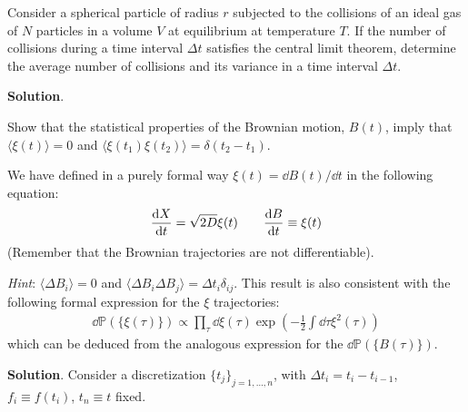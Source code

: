 \documentclass[../template.tex]{subfiles}
\begin{document}
\begin{exo}
    Consider a spherical particle of radius $r$ subjected to the collisions of an ideal gas of $N$ particles in a volume $V$ at equilibrium at temperature $T$. If the number of collisions during a time interval $\Delta t$ satisfies the central limit theorem, determine the average number of collisions and its variance in a time interval $\Delta t$.

    \medskip

    \textbf{Solution}. 
\end{exo}

\begin{exo}
    Show that the statistical properties of the Brownian motion, $B(t)$, imply that $\langle \xi(t) \rangle = 0$ and $\langle \xi(t_1) \xi(t_2) \rangle = \delta(t_2 - t_1)$.

    We have defined in a purely formal way $\xi(t) = \dd{B(t)}/\dd{t}$ in the following equation:
    \begin{align*}
        \dv{X}{t}(t) = \sqrt{2D} \xi(t) \qquad \dv{B}{t}(t) \equiv \xi(t)
    \end{align*}
    (Remember that the Brownian trajectories are not differentiable).
    \medskip

    \textit{Hint}: $\langle \Delta B_i \rangle = 0$ and $\langle \Delta B_i \Delta B_j \rangle = \Delta t_i \delta_{ij}$. This result is also consistent with the following formal expression for the $\xi$ trajectories:
    \begin{align*}
        \dd{\mathbb{P}}(\{\xi(\tau)\}) \propto \prod_{\tau} \dd{\xi(\tau)} \exp\left(-\frac{1}{2} \int \dd{\tau} \xi^2(\tau) \right)
    \end{align*}
    which can be deduced from the analogous expression for the $\dd{\mathbb{P}}(\{B(\tau)\})$.

    \medskip

    \textbf{Solution}. Consider a discretization $\{t_j\}_{j=1,\dots,n}$, with $\Delta t_i = t_i - t_{i-1}$, $f_i \equiv f(t_i)$, $t_n \equiv t$ fixed.
    

\end{exo}
\end{document}
